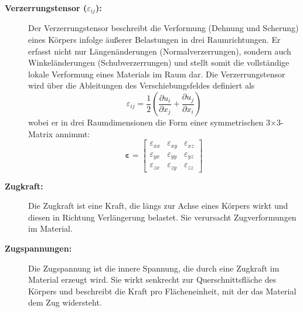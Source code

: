 \begin{description}
	\item[\textbf{Verzerrungstensor ($\varepsilon_{ij}$):}] Der Verzerrungstensor beschreibt die Verformung (Dehnung und Scherung) eines Körpers infolge äußerer Belastungen in drei Raumrichtungen. 
	Er erfasst nicht nur Längenänderungen (Normalverzerrungen), sondern auch Winkeländerungen (Schubverzerrungen) und stellt somit die vollständige lokale Verformung eines Materials im Raum dar.
	Die Verzerrungstensor wird über die Ableitungen des Verschiebungsfeldes definiert als
	\begin{equation}
		\varepsilon_{ij} = 
		\frac{1}{2} \left( \frac{\partial u_i}{\partial x_j} + \frac{\partial u_j}{\partial x_i} \right)
	\end{equation}
	wobei er in drei Raumdimensionen die Form einer symmetrischen 3×3-Matrix annimmt:
	\begin{equation}
	\boldsymbol{\varepsilon} =
	\begin{bmatrix}
		\varepsilon_{xx} & \varepsilon_{xy} & \varepsilon_{xz} \\
		\varepsilon_{yx} & \varepsilon_{yy} & \varepsilon_{yz} \\
		\varepsilon_{zx} & \varepsilon_{zy} & \varepsilon_{zz}
	\end{bmatrix}
	\end{equation}
	\item[\textbf{Zugkraft:}] Die Zugkraft ist eine Kraft, die längs zur Achse eines Körpers wirkt und diesen in Richtung Verlängerung belastet. 
	Sie verursacht Zugverformungen im Material.
	
	\item[\textbf{Zugspannungen:}] Die Zugspannung ist die innere Spannung, die durch eine Zugkraft im Material erzeugt wird. 
	Sie wirkt senkrecht zur Querschnittsfläche des Körpers und beschreibt die Kraft pro Flächeneinheit, mit der das Material dem Zug widersteht.
\end{description}

